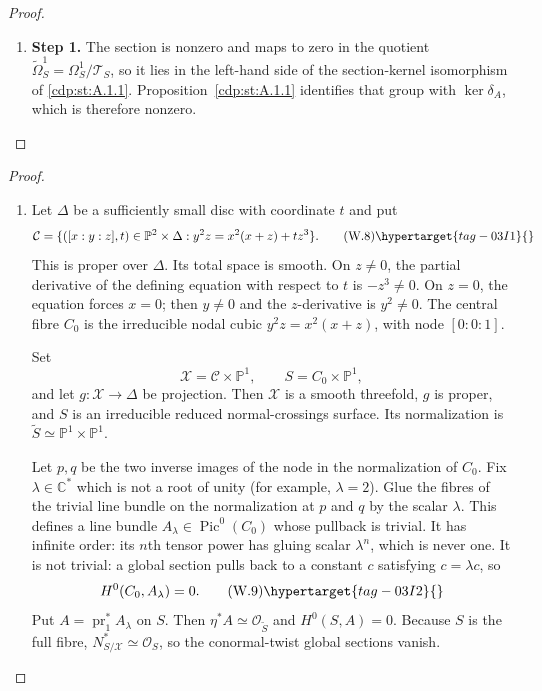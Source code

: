 \begin{proof}
\begin{enumerate}[label={$\langle1\rangle$\arabic*.},leftmargin=*]
\item 
\noindent\textbf{Step 1.} The section is nonzero and maps to zero in the quotient
$\widetilde\Omega^1_S=\Omega^1_S/\mathscr T_S$, so it
lies in the left-hand side of the section-kernel isomorphism of \cref{cdp:st:A.1.1}.  Proposition~\ref{cdp:st:A.1.1}
identifies that group with $\ker\delta_A$, which is therefore nonzero.

\end{enumerate}
\end{proof}

\begin{proof}
\begin{enumerate}[label={$\langle1\rangle$\arabic*.},leftmargin=*]
\item 
Let $\Delta$ be a sufficiently small disc with coordinate $t$ and put
\[
\mathcal C=
\{([x:y:z],t)\in\mathbb P^2\times\Delta:
y^2z=x^2(x+z)+tz^3\}.
\tag{W.8}\hypertarget{tag-03I1}{}\label{wbII:eq:W:5.8}
\]
This is proper over $\Delta$.  Its total space is smooth.  On $z\ne0$, the
partial derivative of the defining equation with respect to $t$ is
$-z^3\ne0$.  On $z=0$, the equation forces $x=0$; then $y\ne0$ and the
$z$-derivative is $y^2\ne0$.  The central fibre $C_0$ is the irreducible
nodal cubic $y^2z=x^2(x+z)$, with node $[0:0:1]$.

Set
\[
\mathcal X=\mathcal C\times\mathbb P^1,\qquad
S=C_0\times\mathbb P^1,
\]
and let $g:\mathcal X\to\Delta$ be projection.  Then $\mathcal X$ is a
smooth threefold, $g$ is proper, and $S$ is an irreducible reduced
normal-crossings surface.  Its normalization is
$\widetilde S\simeq\mathbb P^1\times\mathbb P^1$.

Let $p,q$ be the two inverse images of the node in the normalization of
$C_0$.  Fix $\lambda\in\mathbb C^*$ which is not a root of unity (for
example, $\lambda=2$).  Glue the fibres of
the trivial line bundle on the normalization at $p$ and $q$ by the scalar
$\lambda$.  This defines a line bundle
$A_\lambda\in\operatorname{Pic}^0(C_0)$ whose pullback is trivial.  It has
infinite order: its $n$th tensor power has gluing scalar $\lambda^n$, which
is never one.  It is not trivial: a global section pulls back to a constant
$c$ satisfying
$c=\lambda c$, so
\[
H^0(C_0,A_\lambda)=0.
\tag{W.9}\hypertarget{tag-03I2}{}\label{wbII:eq:W:5.9}
\]
Put $A=\operatorname{pr}_1^*A_\lambda$ on $S$.  Then
$\eta^*A\simeq\mathcal O_{\widetilde S}$ and $H^0(S,A)=0$.
Because $S$ is the full fibre,
$N^*_{S/\mathcal X}\simeq\mathcal O_S$, so the conormal-twist global
sections vanish.


\end{enumerate}
\end{proof}
